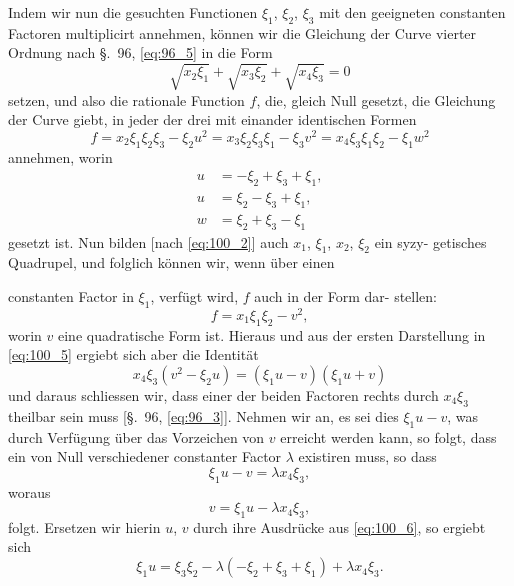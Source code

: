 \documentclass[12pt,a4paper]{article}
\theoremstyle{plain}
\theoremstyle{definition}
\theoremstyle{remark}
\begin{document}
Indem wir nun die gesuchten Functionen $\xi_1$, $\xi_2$, $\xi_3$ mit den
geeigneten constanten Factoren multiplicirt annehmen, können
wir die Gleichung der Curve vierter Ordnung nach \S.~96, \eqref{eq:96_5} in
die Form
\begin{equation}\label{eq:100_4}
\sqrt{x_2 \xi_1} + \sqrt{x_3 \xi_2} + \sqrt{x_4 \xi_3} = 0
\end{equation}
setzen, und also die rationale Function $f$, die, gleich Null gesetzt,
die Gleichung der Curve giebt, in jeder der drei mit einander
identischen Formen
\begin{equation}\label{eq:100_5}
f = x_2 \xi_1 \xi_2 \xi_3 - \xi_2 u^2 = x_3 \xi_2 \xi_3 \xi_1 - \xi_3 v^2 = x_4 \xi_3 \xi_1 \xi_2 - \xi_1 w^2
\end{equation}
annehmen, worin
\begin{equation}\label{eq:100_6}
\begin{aligned}
u &= -\xi_2 + \xi_3 + \xi_1, \\
u &= \xi_2 - \xi_3 + \xi_1, \\
w &= \xi_2 + \xi_3 - \xi_1
\end{aligned}
\end{equation}
gesetzt ist. Nun bilden [nach \eqref{eq:100_2}] auch $x_1$, $\xi_1$, $x_2$, $\xi_2$ ein syzy-
getisches Quadrupel, und folglich können wir, wenn über einen

constanten Factor in $\xi_1$, verfügt wird, $f$ auch in der Form dar-
stellen:
\begin{equation}\label{eq:100_7}
f = x_1 \xi_1 \xi_2 - v^2,
\end{equation}
worin $v$ eine quadratische Form ist. Hieraus und aus der ersten
Darstellung in \eqref{eq:100_5} ergiebt sich aber die Identität
\begin{equation*}
x_4 \xi_3 (v^2 - \xi_2 u) = (\xi_1 u - v)(\xi_1 u + v)
\end{equation*}
und daraus schliessen wir, dass einer der beiden Factoren rechts
durch $x_4 \xi_3$ theilbar sein muss [\S.~96, \eqref{eq:96_3}]. Nehmen wir an, es
sei dies $\xi_1 u - v$, was durch Verfügung über das Vorzeichen von $v$
erreicht werden kann, so folgt, dass ein von Null verschiedener
constanter Factor $\lambda$ existiren muss, so dass
\begin{equation*}
\xi_1 u - v = \lambda x_4 \xi_3,
\end{equation*}
woraus
\begin{equation*}
v = \xi_1 u - \lambda x_4 \xi_3,
\end{equation*}
folgt. Ersetzen wir hierin $u$, $v$ durch ihre Ausdrücke aus \eqref{eq:100_6}, so
ergiebt sich
\begin{equation*}
\xi_1 u = \xi_3 \xi_2 - \lambda(-\xi_2 + \xi_3 + \xi_1) + \lambda x_4 \xi_3.
\end{equation*}
\end{document}
